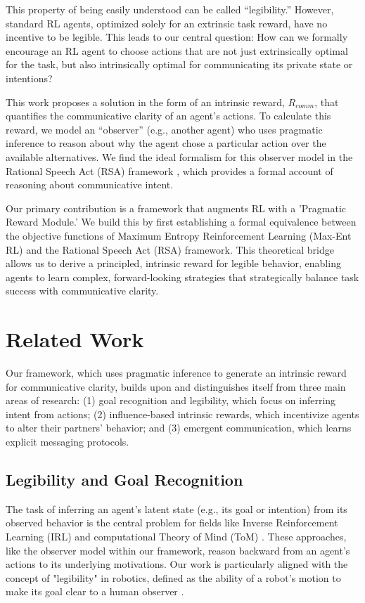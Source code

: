 \documentclass{article}
\begin{document}
This property of being easily understood can be called ``legibility.'' However, standard RL agents, optimized solely for an extrinsic task reward, have no incentive to be legible. This leads to our central question: How can we formally encourage an RL agent to choose actions that are not just extrinsically optimal for the task, but also intrinsically optimal for communicating its private state or intentions?

This work proposes a solution in the form of an intrinsic reward, $R_{comm}$, that quantifies the communicative clarity of an agent's actions. To calculate this reward, we model an ``observer'' (e.g., another agent) who uses pragmatic inference to reason about why the agent chose a particular action over the available alternatives. We find the ideal formalism for this observer model in the Rational Speech Act (RSA) framework \cite{goodman2016pragmatic}, which provides a formal account of reasoning about communicative intent.

Our primary contribution is a framework that augments RL with a 'Pragmatic Reward Module.' We build this by first establishing a formal equivalence between the objective functions of Maximum Entropy Reinforcement Learning (Max-Ent RL) and the Rational Speech Act (RSA) framework. This theoretical bridge allows us to derive a principled, intrinsic reward for legible behavior, enabling agents to learn complex, forward-looking strategies that strategically balance task success with communicative clarity.


\section{Related Work}
\label{sec:related}

Our framework, which uses pragmatic inference to generate an intrinsic reward for communicative clarity, builds upon and distinguishes itself from three main areas of research: (1) goal recognition and legibility, which focus on inferring intent from actions; (2) influence-based intrinsic rewards, which incentivize agents to alter their partners' behavior; and (3) emergent communication, which learns explicit messaging protocols.

\subsection{Legibility and Goal Recognition}

The task of inferring an agent's latent state (e.g., its goal or intention) from its observed behavior is the central problem for fields like Inverse Reinforcement Learning (IRL) \cite{ziebart2008maximum} and computational Theory of Mind (ToM) \cite{baker2017rational}. These approaches, like the observer model within our framework, reason backward from an agent's actions to its underlying motivations. Our work is particularly aligned with the concept of "legibility" in robotics, defined as the ability of a robot's motion to make its goal clear to a human observer \cite{dragan2013legibility}.
\end{document}
